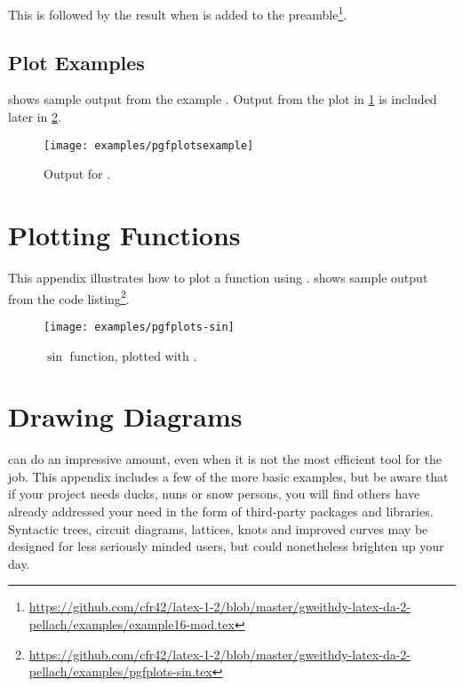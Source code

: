 This is followed by the result when  is added to the preamble\footnote{\url{https://github.com/cfr42/latex-1-2/blob/master/gweithdy-latex-da-2-pellach/examples/example16-mod.tex}}.



\subsection<1-| beamer:0>{Plot Examples}\label{subsec:samples-plots}
 shows sample output from the \pgfplots{} example .
Output from the plot in \cref{sec:fn} is included later in \cref{fig:sin}.
\begin{figure}
  \centering\texttt{[image: examples/pgfplotsexample]}
  \caption{Output for .}\label{fig:pgfplotsexample}
\end{figure}


\section<1-| beamer:0>{Plotting Functions}\label{sec:fn}

This appendix illustrates how to plot a function using \pgfplots.
 shows sample output from the code listing\footnote{\url{https://github.com/cfr42/latex-1-2/blob/master/gweithdy-latex-da-2-pellach/examples/pgfplots-sin.tex}}.


\begin{figure}
  \centering
  \texttt{[image: examples/pgfplots-sin]}
  \caption{$\sin$ function, plotted with \protect\pgfplots.}\label{fig:sin}
\end{figure}

\section<1-| beamer:0>{Drawing Diagrams}\label{sec:dd}

\Tikz{} can do an impressive amount, even when it is not the most efficient tool for the job.
This appendix includes a few of the more basic examples, but be aware that if your project needs ducks, nuns or snow persons, you will find others have already addressed your need in the form of third-party packages and libraries.
Syntactic trees, circuit diagrams, lattices, knots and improved  curves may be designed for less seriously minded users, but could nonetheless brighten up your day.

